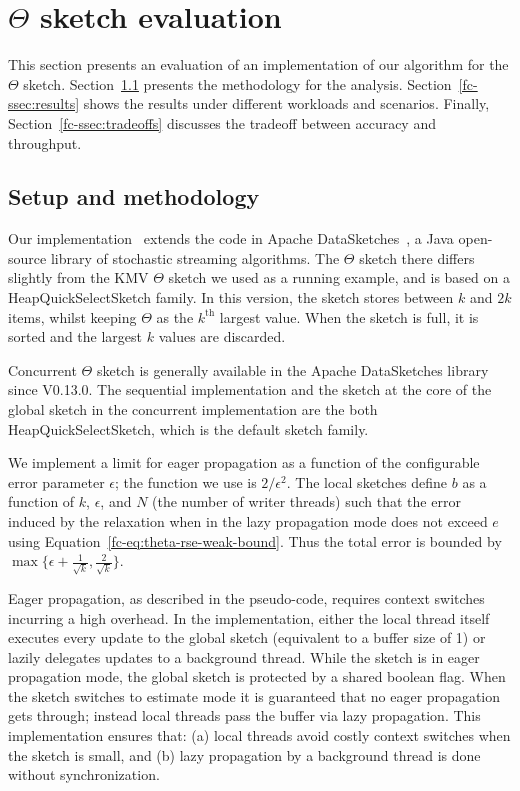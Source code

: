 \section{\texorpdfstring{$\Theta$}{Theta} sketch evaluation}
\label{fc-sec:eval}

This section presents an evaluation of an implementation of our algorithm for the $\Theta$ sketch.
Section~\ref{fc-ssec:setup-and-methodology} presents the methodology for the analysis.
Section~\ref{fc-ssec:results} shows the results under different
workloads and scenarios. Finally, Section~\ref{fc-ssec:tradeoffs} discusses the tradeoff between
accuracy and throughput.

\subsection{Setup and methodology}
\label{fc-ssec:setup-and-methodology}

Our implementation~\cite{ConcurrentThetaImp} extends the code in Apache DataSketches~\cite{DataSketches}, a Java
open-source library of stochastic streaming algorithms. The $\Theta$ sketch there differs slightly
from the KMV $\Theta$ sketch we used as a running example, and is based on a HeapQuickSelectSketch family.
In this version, the sketch stores between $k$ and $2k$ items, whilst keeping $\Theta$ as the $k^{\text{th}}$
largest value. When the sketch is full, it is sorted and the largest $k$ values are discarded.

Concurrent $\Theta$ sketch is generally available in the Apache DataSketches
library since V0.13.0. The sequential implementation and the sketch at the core of the global sketch
in the concurrent implementation are the both \\ HeapQuickSelectSketch, which is the default sketch family.


We implement a limit for eager propagation as a function
of the configurable error parameter $\epsilon$; the function we use is $2 / \epsilon^2$. The local sketches define $b$
as a function of $k$, $\epsilon$, and $N$ (the number of writer threads) such that the error induced by
the relaxation when in the lazy propagation mode does not exceed $e$ using Equation~\ref{fc-eq:theta-rse-weak-bound}.
Thus the total error is bounded by $\max\{\epsilon + \frac{1}{\sqrt{k}}, \frac{2}{\sqrt{k}}\}$.

Eager propagation, as described in the pseudo-code, requires context switches incurring a high overhead. In the
implementation, either the local thread itself executes every update to the global sketch (equivalent to a
buffer size of 1) or lazily delegates updates to a background thread. While the sketch is in eager propagation
mode, the global sketch is protected by a shared boolean flag. When the sketch switches to estimate mode it
is guaranteed that no eager propagation gets through; instead local threads pass the buffer via lazy propagation.
This implementation ensures that: (a) local threads avoid costly context switches when the sketch is small, and (b)
lazy propagation by a background thread is done without synchronization.

